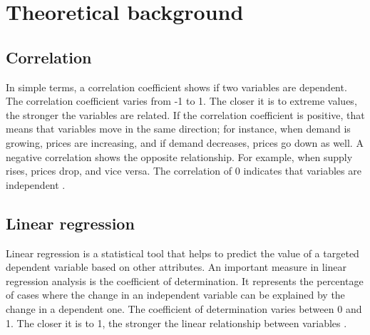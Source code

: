\chapter{Theoretical background}
\section{Correlation}

In simple terms, a correlation coefficient shows if two variables are dependent.
The correlation coefficient varies from -1 to 1. The closer it is to extreme values, the stronger the variables are related. If the correlation coefficient is positive, that means that variables move in the same direction; for instance, when demand is growing, prices are increasing, and if demand decreases, prices go down as well. A negative correlation shows the opposite relationship. For example, when supply rises, prices drop, and vice versa. The correlation of 0 indicates that variables are independent \autocite{DaCostaLewis2005}.

\section{Linear regression}

Linear regression is a statistical tool that helps to predict the value of a targeted dependent variable based on other attributes.
An important measure in linear regression analysis is the coefficient of determination.
It represents the percentage of cases where the change in an independent variable can be explained by the change in a dependent one.
The coefficient of determination varies between 0 and 1.
The closer it is to 1, the stronger the linear relationship between variables \autocite{kumariLinearRegressionAnalysis2018}.

